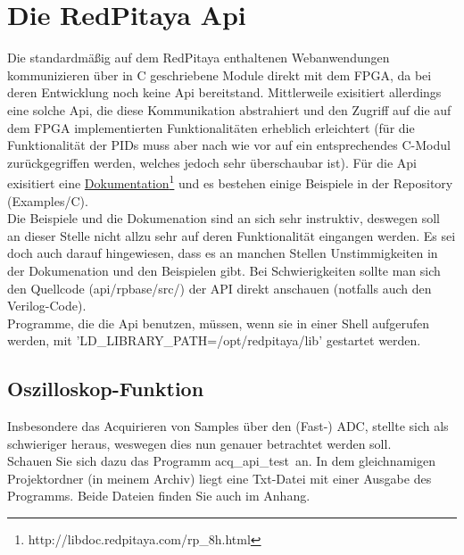 \documentclass[11pt]{scrartcl}
\begin{document}
\section{Die RedPitaya Api}
Die standardmäßig auf dem RedPitaya enthaltenen Webanwendungen kommunizieren über in C geschriebene Module direkt mit dem FPGA, da bei deren Entwicklung noch keine Api bereitstand. Mittlerweile exisitiert allerdings eine solche Api, die diese Kommunikation abstrahiert und den Zugriff auf die auf dem FPGA implementierten Funktionalitäten erheblich erleichtert (für die Funktionalität der PIDs muss aber nach wie vor auf ein entsprechendes C-Modul zurückgegriffen werden, welches jedoch sehr überschaubar ist).
Für die Api exisitiert eine \href{http://libdoc.redpitaya.com/rp_8h.html}{Dokumentation\footnote{http://libdoc.redpitaya.com/rp\_8h.html}} und es bestehen einige Beispiele in der Repository (\grqq Examples/C\grqq ).\\
Die Beispiele und die Dokumenation sind an sich sehr instruktiv, deswegen soll an dieser Stelle nicht allzu sehr auf deren Funktionalität eingangen werden. Es sei doch auch darauf hingewiesen, dass es an manchen Stellen Unstimmigkeiten in der Dokumenation und den Beispielen gibt. Bei Schwierigkeiten sollte man sich den Quellcode (\grqq api/rpbase/src/\grqq ) der API direkt anschauen (notfalls auch den Verilog-Code). \\

Programme, die die Api benutzen, müssen, wenn sie in einer Shell aufgerufen werden, mit 'LD\_LIBRARY\_PATH=/opt/redpitaya/lib' gestartet werden.

\subsection{Oszilloskop-Funktion}
Insbesondere das Acquirieren von Samples über den (Fast-) ADC, stellte sich als schwieriger heraus, weswegen dies nun genauer betrachtet werden soll.\\
Schauen Sie sich dazu das Programm \grqq acq\_api\_test\grqq~an. In dem gleichnamigen Projektordner (in meinem Archiv) liegt eine Txt-Datei mit einer Ausgabe des Programms. Beide Dateien finden Sie auch im Anhang.\\
\end{document}
